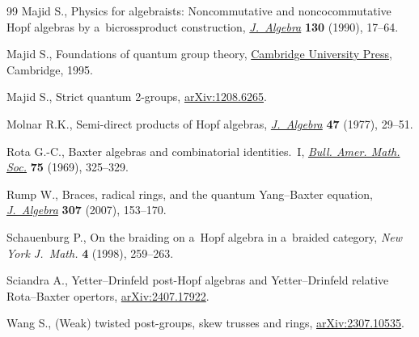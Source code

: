 \documentclass[pdftex]{sigma}
\numberwithin{equation}{section}
\begin{document}
\begin{thebibliography}{99}
Majid S., Physics for algebraists: {N}oncommutative and noncocommutative {H}opf
 algebras by a~bicrossproduct construction, \href{https://doi.org/10.1016/0021-8693(90)90099-A}{\textit{J.~Algebra}} \textbf{130}
 (1990), 17--64.

Majid S., Foundations of quantum group theory, \href{https://doi.org/10.1017/CBO9780511613104}{Cambridge University Press},
 Cambridge, 1995.

Majid S., Strict quantum 2-groups, \href{https://arxiv.org/abs/1208.6265}{arXiv:1208.6265}.

Molnar R.K., Semi-direct products of {H}opf algebras, \href{https://doi.org/10.1016/0021-8693(77)90208-3}{\textit{J.~Algebra}}
 \textbf{47} (1977), 29--51.

Rota G.-C., Baxter algebras and combinatorial identities.~{I}, \href{https://doi.org/10.1090/S0002-9904-1969-12156-7}{\textit{Bull.
 Amer. Math. Soc.}} \textbf{75} (1969), 325--329.

Rump W., Braces, radical rings, and the quantum {Y}ang--{B}axter equation,
 \href{https://doi.org/10.1016/j.jalgebra.2006.03.040}{\textit{J.~Algebra}} \textbf{307} (2007), 153--170.

Schauenburg P., On the braiding on a~{H}opf algebra in a~braided category,
 \textit{New York J.~Math.} \textbf{4} (1998), 259--263.

Sciandra A., {Y}etter--{D}rinfeld post-Hopf algebras and {Y}etter--{D}rinfeld
 relative {R}ota--{B}axter opertors, \href{https://arxiv.org/abs/2407.17922}{arXiv:2407.17922}.

Wang S., (Weak) twisted post-groups, skew trusses and rings,
 \href{https://arxiv.org/abs/2307.10535}{arXiv:2307.10535}.

\end{thebibliography}\LastPageEnding
\end{document}
